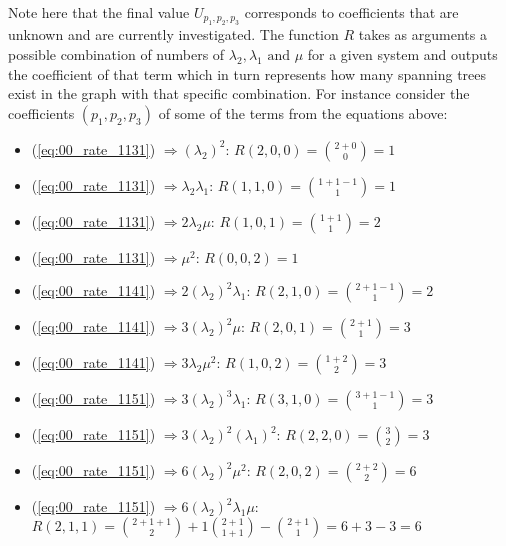 Note here that the final value \(U_{p_1,p_2,p_3}\) corresponds to coefficients 
that are unknown and are currently investigated. 
The function \(R\) takes as arguments a possible combination of numbers of 
\(\lambda_2, \lambda_1 \text{ and } \mu \) for a given system and outputs the 
coefficient of that term which in turn represents how many spanning trees exist 
in the graph with that specific combination. 
For instance consider the coefficients \((p_1,p_2,p_3)\) of some of the terms 
from the equations above:

\tiny
\begin{multicols}{2}
    \begin{itemize}
        \item (\ref{eq:00_rate_1131}) \( \Rightarrow (\lambda_2)^2\): 
        \(R(2,0,0) = \binom{2+0}{0} = 1\)
        \item (\ref{eq:00_rate_1131}) \( \Rightarrow \lambda_2 \lambda_1\): 
        \(R(1,1,0) = \binom{1+1-1}{1} = 1\)
        \item (\ref{eq:00_rate_1131}) \( \Rightarrow 2 \lambda_2 \mu\): 
        \(R(1,0,1) = \binom{1+1}{1} = 2\)
        \item (\ref{eq:00_rate_1131}) \( \Rightarrow \mu^2\): \(R(0,0,2) = 1\)
        \item (\ref{eq:00_rate_1141}) \( \Rightarrow 2(\lambda_2)^2 \lambda_1\): 
        \(R(2,1,0) = \binom{2+1-1}{1} = 2\)
        \item (\ref{eq:00_rate_1141}) \( \Rightarrow 3(\lambda_2)^2 \mu\): 
        \(R(2,0,1) = \binom{2+1}{1} = 3\)
        \item (\ref{eq:00_rate_1141}) \( \Rightarrow 3 \lambda_2 \mu^2\): 
        \(R(1,0,2) = \binom{1+2}{2} = 3\)
        \item (\ref{eq:00_rate_1151}) \( \Rightarrow 3 (\lambda_2)^3 \lambda_1\): 
        \(R(3,1,0) = \binom{3+1-1}{1} = 3\)
        \item (\ref{eq:00_rate_1151}) \( \Rightarrow 3 (\lambda_2)^2 (\lambda_1)^2 \):
        \(R(2,2,0) = \binom{3}{2} = 3\)
        \item (\ref{eq:00_rate_1151}) \( \Rightarrow 6 (\lambda_2)^2 \mu ^ 2\): 
        \(R(2,0,2) = \binom{2+2}{2} = 6\)
    \end{itemize}
\end{multicols}

\begin{itemize}
    \item (\ref{eq:00_rate_1151}) \( \Rightarrow 6 (\lambda_2)^2 \lambda_1 \mu\): 
    \(R(2,1,1) = \binom{2+1+1}{2} + 1\binom{2+1}{1+1} - \binom{2+1}{1} = 6 + 3 - 3 = 6\)
\end{itemize}
\normalsize

